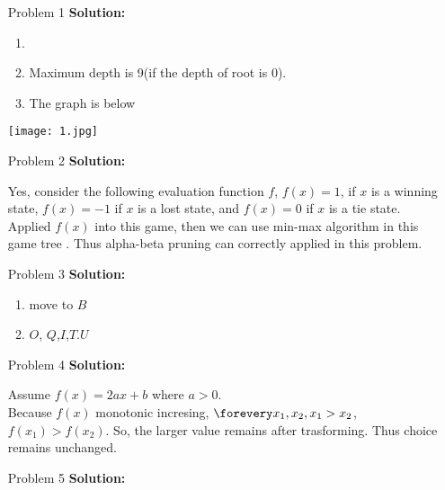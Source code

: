 \normalfont\documentclass[letterpaper,11pt]{article}
\begin{document}
\setlength{\parindent}{2ex}
\newcommand{\header}{
	\noindent {}
}
\bigskip
\header

\begin{enumerate}
\item[Problem 1]\textbf{Solution:}\par
	\begin{enumerate}
		\item
		\item Maximum depth is 9(if the depth of root is $0$).
		\item The graph is below\par
	\end{enumerate}
	\texttt{[image: 1.jpg]}
	
\item[Problem 2]\textbf{Solution:}\par
	Yes, consider the following evaluation function $f$, $f(x) = 1$, if $x$ is a winning state, $f(x) = -1$ if $x$ is a lost state, and $f(x) = 0$ if $x$ is a tie state. Applied $f(x)$ into this game, then we can use min-max algorithm in this game tree . Thus alpha-beta pruning can correctly applied in this problem.
\item [Problem 3]\textbf{Solution:}\par
	\begin{enumerate}
		\item move to $B$
		\item $O$, $Q$,$I$,$T$.$U$
	\end{enumerate}	
\item[Problem 4]\textbf{Solution:}\par
	Assume $f(x) = 2ax + b$ where $a > 0$.\\
	Because $f(x)$ monotonic incresing, $\forevery x_1,x_2, x_1 > x_2$, $f(x_1)> f(x_2)$. So, the larger value remains after trasforming. Thus choice remains unchanged.
\item [Problem 5]\textbf{Solution:}\par


\end{enumerate}
\end{document}

